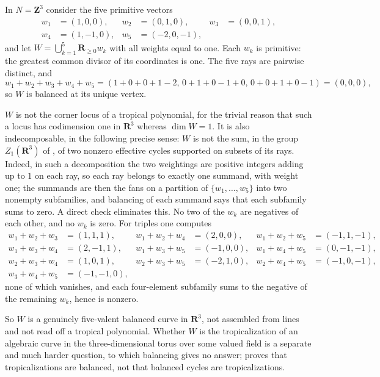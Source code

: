 \begin{example}
\label{ex:ch10-codim-two-fan}
In $N=\mathbf Z^3$ consider the five primitive vectors
\[
\begin{aligned}
 w_1&=(1,0,0), & w_2&=(0,1,0), & w_3&=(0,0,1),\\
 w_4&=(1,-1,0), & w_5&=(-2,0,-1),
\end{aligned}
\]
and let $W=\bigcup_{k=1}^5\mathbf R_{\geq0}w_k$ with all weights equal to
one.  Each $w_k$ is primitive: the greatest common divisor of its
coordinates is one.  The five rays are pairwise distinct, and
\[
 w_1+w_2+w_3+w_4+w_5
 =(1+0+0+1-2,\,0+1+0-1+0,\,0+0+1+0-1)
 =(0,0,0),
\]
so $W$ is balanced at its unique vertex.

$W$ is not the corner locus of a tropical polynomial, for the trivial reason
that such a locus has codimension one in $\mathbf R^3$ whereas $\dim W=1$.
It is also indecomposable, in the following precise sense: $W$ is not the
sum, in the group $Z_1(\mathbf R^3)$ of
, of two nonzero effective cycles supported on
subsets of its rays.  Indeed, in such a decomposition the two weightings are
positive integers adding up to $1$ on each ray, so each ray belongs to
exactly one summand, with weight one; the summands are then the fans on a
partition of $\{w_1,\ldots,w_5\}$ into two nonempty subfamilies, and
balancing of each summand says that each subfamily sums to zero.  A direct
check eliminates this.  No two of the $w_k$ are
negatives of each other, and no $w_k$ is zero.  For triples one computes
\[
\begin{aligned}
 w_1{+}w_2{+}w_3&=(1,1,1), &
 w_1{+}w_2{+}w_4&=(2,0,0), &
 w_1{+}w_2{+}w_5&=(-1,1,-1),\\
 w_1{+}w_3{+}w_4&=(2,-1,1), &
 w_1{+}w_3{+}w_5&=(-1,0,0), &
 w_1{+}w_4{+}w_5&=(0,-1,-1),\\
 w_2{+}w_3{+}w_4&=(1,0,1), &
 w_2{+}w_3{+}w_5&=(-2,1,0), &
 w_2{+}w_4{+}w_5&=(-1,0,-1),\\
 w_3{+}w_4{+}w_5&=(-1,-1,0), & & & &
\end{aligned}
\]
none of which vanishes, and each four-element subfamily sums to the negative
of the remaining $w_k$, hence is nonzero.

So $W$ is a genuinely five-valent balanced curve in $\mathbf R^3$, not
assembled from lines and not read off a tropical polynomial.  Whether $W$ is
the tropicalization of an algebraic curve in the three-dimensional torus over
some valued field is a separate and much harder question, to which balancing
gives no answer;  proves that
tropicalizations are balanced, not that balanced cycles are
tropicalizations.
\end{example}

